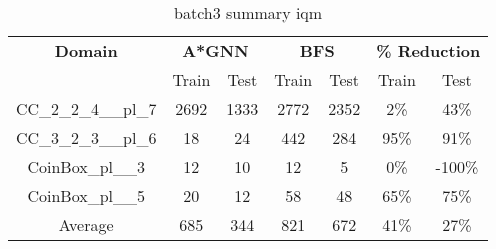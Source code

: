 \begin{table}[!ht]
  \small
  \centering
  \begin{tabular}{c|cc|cc|cc}
    \textbf{Domain}
      & \multicolumn{2}{c|}{\textbf{A*GNN}}
      & \multicolumn{2}{c|}{\textbf{BFS}}
      & \multicolumn{2}{c}{\textbf{\% Reduction}} \\
    \cline{2-7}
    & Train & Test & Train & Test & Train & Test \\
    \hline

    CC\_2\_2\_4\_\_pl\_7 & 2692 & 1333 & 2772 & 2352 & 2\% & 43\% \\
    CC\_3\_2\_3\_\_pl\_6 & 18 & 24 & 442 & 284 & 95\% & 91\% \\
    CoinBox\_pl\_\_3 & 12 & 10 & 12 & 5 & 0\% & -100\% \\
    CoinBox\_pl\_\_5 & 20 & 12 & 58 & 48 & 65\% & 75\% \\
    \hline
    Average & 685 & 344 & 821 & 672 & 41\% & 27\% \\

  \end{tabular}
  \caption{batch3 summary iqm}
  \label{tab:batch3_res}
\end{table}
